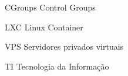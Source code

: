 
\begin{siglas}
  \item[CGroups] Control Groups
  \item[LXC] Linux Container
  \item[VPS] Servidores privados virtuais
  \item[TI] Tecnologia da Informação
\end{siglas}

